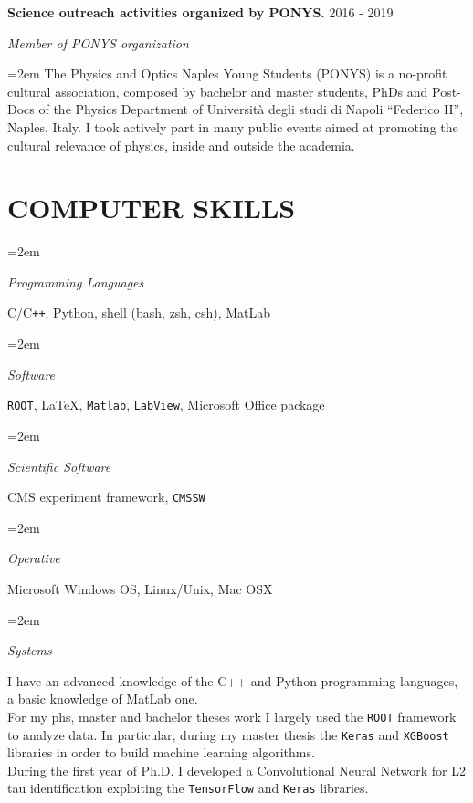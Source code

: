 \documentclass[paper=a4,fontsize=12pt]{article} %
\newcommand{\openquote}{``}
\newcommand{\closequote}{''}
\newlength{\spacebox}
\newcommand{\sepspace}{\vspace*{1em}}		%
\newcommand{\sepspacesmall}{\vspace*{0.3em}}
\newcommand{\NewPart}[1]{\section*{\uppercase{#1}}}
\newcommand{\PersonalEntry}[2]{
	\noindent\hangindent=2em\hangafter=0 %
	\vspace{0.7em}
	\parbox{\spacebox}{        %
		\footnotesize{\textit{#1}}}		       %
	\hspace{1.3em} #2 \par}    %
\newcommand{\SkillsEntry}[2]{      %
	\noindent\hangindent=2em\hangafter=0 %
	\parbox{\spacebox}{        %
		\textit{#1}}			   %
	\hspace{1.5em} #2 \par}    %
\newcommand{\EducationEntry}[4]{
	\noindent \textbf{#1} \hfill      %
	{#2} \par  %
	\noindent \textit{#3} \par        %
	\noindent\hangindent=2em\hangafter=0 \small #4 %
	\normalsize \par}
\begin{document}
     \sepspacesmall
	\EducationEntry{Science outreach activities organized by PONYS.}{2016 - 2019}{Member of PONYS organization}{The Physics and Optics Naples Young Students (PONYS) is a no-profit cultural association, composed by bachelor and master students, PhDs and Post-Docs of the Physics Department of Università degli studi di Napoli \openquote Federico II\closequote, Naples, Italy. I took actively part in many public events aimed at promoting the cultural relevance of physics, inside and outside the academia.
	}
     \sepspacesmall
	
    
    
	
    \sepspacesmall
	\NewPart{Computer skills}
	\SkillsEntry{Programming Languages}{C/C\texttt{++}, Python,  shell (bash, zsh, csh), MatLab}
    \sepspacesmall
	\SkillsEntry{Software}{\texttt{ROOT}, \LaTeX, \texttt{Matlab}, \texttt{LabView}, Microsoft Office package}
	\sepspace
	\SkillsEntry{Scientific Software}{CMS experiment framework, \texttt{CMSSW}}
     \sepspacesmall
	\SkillsEntry{Operative}{Microsoft Windows OS, Linux/Unix, Mac OSX}
	\SkillsEntry{Systems}{}  \vspace{2mm}	
 \noindent	I have an advanced knowledge of the C++ and Python programming languages, a basic knowledge of MatLab one. \\ For my phs, master and bachelor theses work I largely used the \texttt{ROOT} framework to analyze data. In particular, during my master thesis the \texttt{Keras} and \texttt{XGBoost} libraries in order to build machine learning algorithms. \\ During the first year of Ph.D. I developed a Convolutional Neural Network for L2 tau identification exploiting the \texttt{TensorFlow} and \texttt{Keras} libraries.\\
 	
     \sepspacesmall
 	
\end{document}
